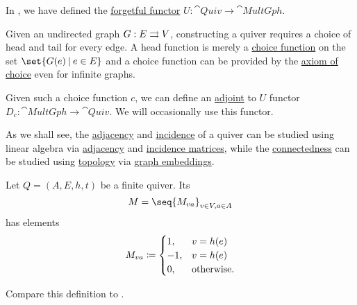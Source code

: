 \begin{definition}\label{def:multigraph_adjunction}
  In , we have defined the \hyperref[rem:forgetful_functor]{forgetful functor} \( U: \hyperref[def:category_of_small_quivers]{\cat{Quiv}} \to \hyperref[def:undirected_graph]{\cat{MultGph}} \).

  Given an undirected graph \( G: E \rightrightarrows V \), constructing a quiver requires a choice of head and tail for every edge. A head function is merely a \hyperref[def:choice_function]{choice function} on the set \( \set{ G(e) \given e \in E } \) and a choice function can be provided by the \hyperref[def:zfc/choice]{axiom of choice} even for infinite graphs.

  Given such a choice function \( c \), we can define an \hyperref[rem:forgetful_functor]{adjoint} to \( U \) functor \( D_c: \cat{MultGph} \to \cat{Quiv} \). We will occasionally use this functor.
\end{definition}

\begin{remark}\label{rem:graphs_linear_algebra_and_topology}
  As we shall see, the \hyperref[def:graph/adjacent_vertices]{adjacency} and \hyperref[def:graph/incidence]{incidence} of a quiver can be studied using linear algebra via \hyperref[def:graph_adjacency_matrix]{adjacency} and \hyperref[def:hypergraph_incidence_matrix]{incidence matrices}, while the \hyperref[def:quiver_connectedness]{connectedness} can be studied using \hyperref[def:quiver_connectedness]{topology} via \hyperref[def:quiver_geometric_relization/embedding]{graph embeddings}.
\end{remark}

\begin{definition}\label{def:quiver_incidence_matrix}
  Let \( Q = (A, E, h, t) \) be a finite quiver. Its 
  \begin{equation*}
    M = \seq{ M_{va} }_{v \in V, a \in A}
  \end{equation*}
  has elements
  \begin{equation*}
    M_{va} \coloneqq \begin{cases}
      1,  &v = h(e) \\
      -1, &v = h(e) \\
      0,  &\T{otherwise.}
    \end{cases}
  \end{equation*}

  Compare this definition to .
\end{definition}

